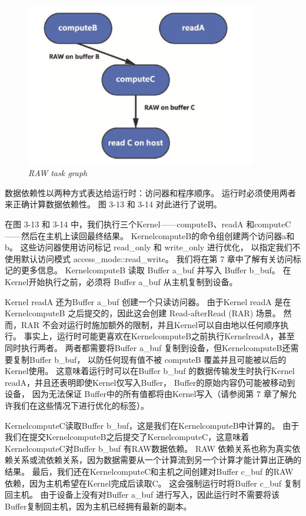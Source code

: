 \begin{figure}[H]
	\centering
	\includegraphics[width=0.9\textwidth]{figs/F3.14.png}
	\caption{\textit{RAW task graph}}
\end{figure}

数据依赖性以两种方式表达给运行时：访问器和程序顺序。 运行时必须使用两者来正确计算数据依赖性。 
图 3-13 和 3-14 对此进行了说明。

在图 3-13 和 3-14 中，我们执行三个Kernel——computeB、readA 和computeC——然后在主机上读回最终结果。 
KernelcomputeB的命令组创建两个访问器a和b。 这些访问器使用访问标记 read\_only 和 write\_only 进行优化，
以指定我们不使用默认访问模式 access\_mode::read\_write。 我们将在第 7 章中了解有关访问标记的更多信息。
KernelcomputeB 读取 Buffer a\_buf 并写入 Buffer b\_buf。 
在Kernel开始执行之前，必须将 Buffer a\_buf 从主机复制到设备。

Kernel readA 还为Buffer a\_buf 创建一个只读访问器。 
由于Kernel readA 是在KernelcomputeB 之后提交的，因此这会创建 Read-afterRead (RAR) 场景。 
然而，RAR 不会对运行时施加额外的限制，并且Kernel可以自由地以任何顺序执行。 
事实上，运行时可能更喜欢在KernelcomputeB之前执行KernelreadA，甚至同时执行两者。 
两者都需要将Buffer a\_buf 复制到设备，但KernelcomputeB还需要复制Buffer b\_buf，
以防任何现有值不被 computeB 覆盖并且可能被以后的Kernel使用。 
这意味着运行时可以在Buffer b\_buf 的数据传输发生时执行Kernel readA，并且还表明即使Kernel仅写入Buffer，
Buffer的原始内容仍可能被移动到设备，
因为无法保证 Buffer中的所有值都将由Kernel写入（请参阅第 7 章了解允许我们在这些情况下进行优化的标签）。

KernelcomputeC读取Buffer b\_buf，这是我们在KernelcomputeB中计算的。 
由于我们在提交KernelcomputeB之后提交了KernelcomputeC，这意味着KernelcomputeC对Buffer b\_buf 有RAW数据依赖。 
RAW 依赖关系也称为真实依赖关系或流依赖关系，因为数据需要从一个计算流到另一个计算才能计算出正确的结果。 
最后，我们还在KernelcomputeC和主机之间创建对Buffer c\_buf 的RAW依赖，因为主机希望在Kernel完成后读取C。 
这会强制运行时将Buffer c\_buf 复制回主机。 
由于设备上没有对Buffer a\_buf 进行写入，因此运行时不需要将该Buffer复制回主机，因为主机已经拥有最新的副本。


